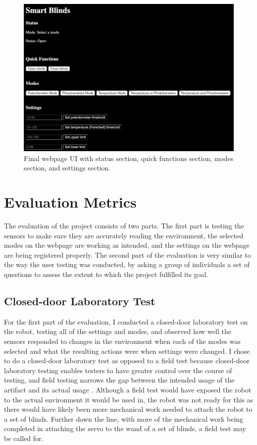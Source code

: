\documentclass[10pt,twocolumn]{article}
\begin{document}
\begin{figure}
    \centering
    \includegraphics[width=.95\linewidth]{Figure 8.png}
    \caption{
        Final webpage UI with status section, quick functions section, modes section, and settings section.
    }
    \label{fig:fig8}
\end{figure}

\section{Evaluation Metrics}
The evaluation of the project consists of two parts. The first part is testing the sensors to make sure they are accurately reading the environment, the selected modes on the webpage are working as intended, and the settings on the webpage are being registered properly.  The second part of the evaluation is very similar to the way the user testing was conducted, by asking a group of individuals a set of questions to assess the extent to which the project fulfilled its goal.

\subsection{Closed-door Laboratory Test}
For the first part of the evaluation, I conducted a closed-door laboratory test on the robot, testing all of the settings and modes, and observed how well the sensors responded to changes in the environment when each of the modes was selected and what the resulting actions were when settings were changed. I chose to do a closed-door laboratory test as opposed to a field test because closed-door laboratory testing enables testers to have greater control over the course of testing, and field testing narrows the gap between the intended usage of the artifact and its actual usage \cite{Tran2016}. Although a field test would have exposed the robot to the actual environment it would be used in, the robot was not ready for this as there would have likely been more mechanical work needed to attach the robot to a set of blinds. Further down the line, with more of the mechanical work being completed in attaching the servo to the wand of a set of blinds, a field test may be called for.
\end{document}
